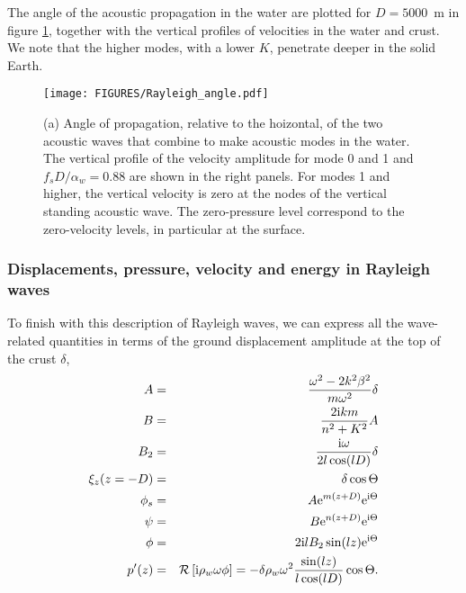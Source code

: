 The angle of the acoustic propagation in the water are plotted for $D=5000$~m 
in  figure \ref{fig:Rayleigh_angle}, together with the vertical profiles of velocities in the water and crust. 
We note that the higher modes, with a lower $K$, penetrate deeper in the solid Earth. 
\begin{figure}[htb]
\centerline{\texttt{[image: FIGURES/Rayleigh\_angle.pdf]}}
  \caption{(a) Angle of propagation, relative to the hoizontal, of the two acoustic 
  waves that combine to make acoustic modes in the water. The vertical profile of the velocity amplitude for mode 0 and 1 and 
  $f_s D/\alpha_w=0.88$ are shown in the right panels. For modes 1 and higher, the vertical velocity is zero 
  at the nodes of the vertical standing acoustic wave. The zero-pressure level correspond to the zero-velocity levels,  
  in particular at the surface.}
\label{fig:Rayleigh_angle}
\end{figure}

\subsubsection{Displacements, pressure, velocity and energy in Rayleigh waves}
To finish with this description of Rayleigh waves, we can express 
all the wave-related quantities in terms of the ground displacement amplitude at the top of the crust  $\delta$,
\begin{eqnarray}
A &=& \frac{\omega^2-2k^2 \beta^2}{m \omega^2} \delta \\
 B&=& \frac{2 \mathrm{i} k m}{n^2+K^2} A \\
B_2 &=& \frac{\mathrm{i} \omega}{2 l \cos(lD)} \delta \\
\xi_z (z=-D) &=& \delta \cos \Theta \\
  \phi_s &=&  A \mathrm{e}^{m(z+D)}\mathrm{e}^{\mathrm{i} \Theta} \\
  \psi   &=& B  \mathrm{e}^{n(z+D)}\mathrm{e}^{\mathrm{i} \Theta} \\ 
\phi &=&  2 \mathrm{i} l B_2 \sin(lz) \mathrm{e}^{\mathrm{i} \Theta}  \\
p'(z)&=&  {\cal R}\left[\mathrm{i} \rho_w \omega \phi\right] =  - \delta \rho_w  \omega^2 \frac{\sin(lz)}{l\cos(lD)}  \cos \Theta.
\end{eqnarray}

